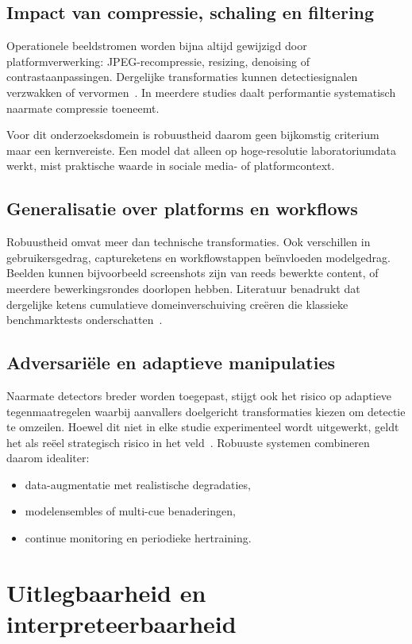 \subsection{Impact van compressie, schaling en filtering}
Operationele beeldstromen worden bijna altijd gewijzigd door platformverwerking: JPEG-recompressie, resizing, denoising of contrastaanpassingen. Dergelijke transformaties kunnen detectiesignalen verzwakken of vervormen~\autocite{CompressionHybrid2025,EvaluationModels2025}. In meerdere studies daalt performantie systematisch naarmate compressie toeneemt.

Voor dit onderzoeksdomein is robuustheid daarom geen bijkomstig criterium maar een kernvereiste. Een model dat alleen op hoge-resolutie laboratoriumdata werkt, mist praktische waarde in sociale media- of platformcontext.

\subsection{Generalisatie over platforms en workflows}
Robuustheid omvat meer dan technische transformaties. Ook verschillen in gebruikersgedrag, captureketens en workflowstappen beïnvloeden modelgedrag. Beelden kunnen bijvoorbeeld screenshots zijn van reeds bewerkte content, of meerdere bewerkingsrondes doorlopen hebben. Literatuur benadrukt dat dergelijke ketens cumulatieve domeinverschuiving creëren die klassieke benchmarktests onderschatten~\autocite{Pei2024,Hasan2026}.

\subsection{Adversariële en adaptieve manipulaties}
Naarmate detectors breder worden toegepast, stijgt ook het risico op adaptieve tegenmaatregelen waarbij aanvallers doelgericht transformaties kiezen om detectie te omzeilen. Hoewel dit niet in elke studie experimenteel wordt uitgewerkt, geldt het als reëel strategisch risico in het veld~\autocite{Hasan2026}. Robuuste systemen combineren daarom idealiter:
\begin{itemize}
  \item data-augmentatie met realistische degradaties,
  \item modelensembles of multi-cue benaderingen,
  \item continue monitoring en periodieke hertraining.
\end{itemize}

\section{Uitlegbaarheid en interpreteerbaarheid}

